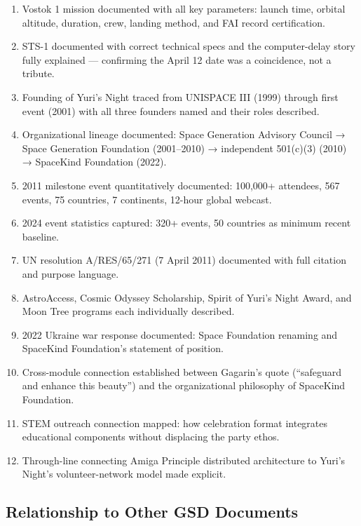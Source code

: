 \documentclass[11pt,letterpaper]{article}
\begin{document}
\begin{enumerate}[leftmargin=*, label=\textbf{SC-\arabic*}]
  \item Vostok 1 mission documented with all key parameters: launch time, orbital altitude, duration, crew, landing method, and FAI record certification.
  \item STS-1 documented with correct technical specs and the computer-delay story fully explained — confirming the April 12 date was a coincidence, not a tribute.
  \item Founding of Yuri's Night traced from UNISPACE III (1999) through first event (2001) with all three founders named and their roles described.
  \item Organizational lineage documented: Space Generation Advisory Council → Space Generation Foundation (2001--2010) → independent 501(c)(3) (2010) → SpaceKind Foundation (2022).
  \item 2011 milestone event quantitatively documented: 100,000+ attendees, 567 events, 75 countries, 7 continents, 12-hour global webcast.
  \item 2024 event statistics captured: 320+ events, 50 countries as minimum recent baseline.
  \item UN resolution A/RES/65/271 (7 April 2011) documented with full citation and purpose language.
  \item AstroAccess, Cosmic Odyssey Scholarship, Spirit of Yuri's Night Award, and Moon Tree programs each individually described.
  \item 2022 Ukraine war response documented: Space Foundation renaming and SpaceKind Foundation's statement of position.
  \item Cross-module connection established between Gagarin's quote (``safeguard and enhance this beauty'') and the organizational philosophy of SpaceKind Foundation.
  \item STEM outreach connection mapped: how celebration format integrates educational components without displacing the party ethos.
  \item Through-line connecting Amiga Principle distributed architecture to Yuri's Night's volunteer-network model made explicit.
\end{enumerate}

\subsection{Relationship to Other GSD Documents}
\end{document}
